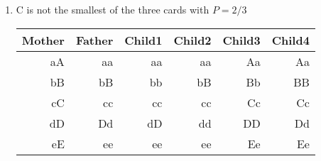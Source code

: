 \begin{enumerate}
	\item C is not the smallest of the three cards with $ P = 2/3 $
	
	\begin{table}[H]
		\centering
		\begin{tabular}{@{}rr|rrrr@{}}
			\toprule
			Mother & Father & Child1 & Child2 & Child3 & Child4 \\ \midrule
			aA     & aa		& aa	 & aa 	  & Aa 	   & Aa   \\
			bB     & bB     & bb	 & bB 	  & Bb 	   & BB    \\
			cC     & cc     & cc	 & cc 	  & Cc 	   & Cc    \\
			dD     & Dd     & dD	 & dd 	  & DD 	   & Dd    \\
			eE     & ee     & ee	 & ee 	  & Ee 	   & Ee    \\ \bottomrule
		\end{tabular}
	\end{table}
	
	
	
\end{enumerate} 